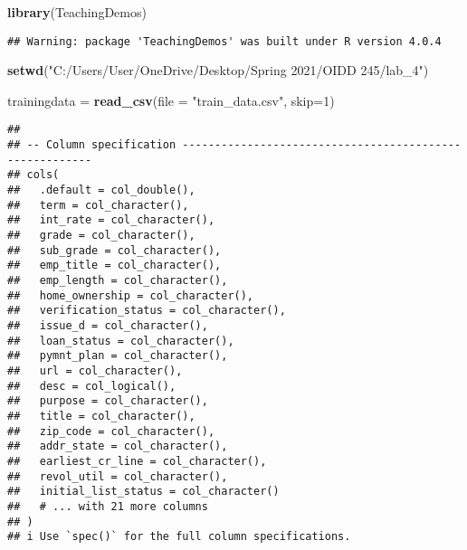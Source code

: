 \documentclass[
]{article}
\newenvironment{Shaded}{\begin{snugshade}}{\end{snugshade}}
\newcommand{\DataTypeTok}[1]{\textcolor[rgb]{0.13,0.29,0.53}{#1}}
\newcommand{\DecValTok}[1]{\textcolor[rgb]{0.00,0.00,0.81}{#1}}
\newcommand{\KeywordTok}[1]{\textcolor[rgb]{0.13,0.29,0.53}{\textbf{#1}}}
\newcommand{\NormalTok}[1]{#1}
\newcommand{\StringTok}[1]{\textcolor[rgb]{0.31,0.60,0.02}{#1}}
\begin{document}
\begin{Shaded}
\begin{Highlighting}[]
\KeywordTok{library}\NormalTok{(TeachingDemos)}
\end{Highlighting}
\end{Shaded}

\begin{verbatim}
## Warning: package 'TeachingDemos' was built under R version 4.0.4
\end{verbatim}

\begin{Shaded}
\begin{Highlighting}[]
\KeywordTok{setwd}\NormalTok{(}\StringTok{"C:/Users/User/OneDrive/Desktop/Spring 2021/OIDD 245/lab_4"}\NormalTok{)}
\end{Highlighting}
\end{Shaded}

\begin{Shaded}
\begin{Highlighting}[]
\NormalTok{trainingdata =}\StringTok{ }\KeywordTok{read_csv}\NormalTok{(}\DataTypeTok{file =} \StringTok{"train_data.csv"}\NormalTok{, }\DataTypeTok{skip=}\DecValTok{1}\NormalTok{)}
\end{Highlighting}
\end{Shaded}

\begin{verbatim}
## 
## -- Column specification --------------------------------------------------------
## cols(
##   .default = col_double(),
##   term = col_character(),
##   int_rate = col_character(),
##   grade = col_character(),
##   sub_grade = col_character(),
##   emp_title = col_character(),
##   emp_length = col_character(),
##   home_ownership = col_character(),
##   verification_status = col_character(),
##   issue_d = col_character(),
##   loan_status = col_character(),
##   pymnt_plan = col_character(),
##   url = col_character(),
##   desc = col_logical(),
##   purpose = col_character(),
##   title = col_character(),
##   zip_code = col_character(),
##   addr_state = col_character(),
##   earliest_cr_line = col_character(),
##   revol_util = col_character(),
##   initial_list_status = col_character()
##   # ... with 21 more columns
## )
## i Use `spec()` for the full column specifications.
\end{verbatim}
\end{document}

